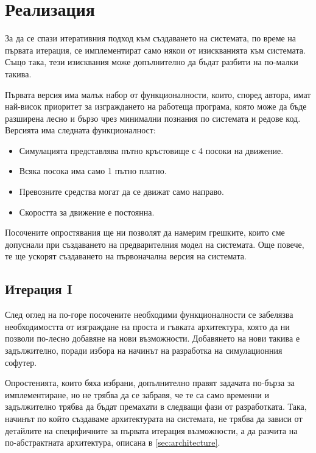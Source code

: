 \section{Реализация}

	За да се спази итеративния подход към създаването на системата,
	по време на първата итерация, се имплементират само някои от изискванията към системата. 
	Също така, тези изисквания може допълнително да бъдат разбити на по-малки такива.
	
	Първата версия има малък набор от функционалности, които, според автора, имат най-висок приоритет за
	изграждането на работеща програма, която може да бъде разширена лесно и бързо
	чрез минимални познания по системата и редове код.
	Версията има следната функционалност:
	\begin{itemize}
		\item Симулацията представлява пътно кръстовище с 4 посоки на движение.
		\item Всяка посока има само 1 пътно платно.
		\item Превозните средства могат да се движат само направо.
		\item Скоростта за движение е постоянна.
	\end{itemize}
	
	Посочените опростявания ще ни позволят да намерим грешките, които сме допуснали
	при създаването на предварителния модел на системата. Още повече, 
	те ще ускорят създаването на първоначална версия на системата.
	
	\subsection{Итерация I}
	
		След оглед на по-горе посочените необходими функционалности се забелязва необходимостта от 
		изграждане на проста и гъвката архитектура, която да ни позволи по-лесно добавяне на нови възможности. 
		Добавянето на нови такива е задължително, поради избора на начинът на разработка на симулационния софутер. 		
		
		Опростенията, които бяха избрани, допълнително правят задачата по-бърза за имплементиране,
		но не трябва да се забравя, че те са само временни и задължително трябва да бъдат премахати
		в следващи фази от разработката. Така, начинът по който създаваме архитектурата
		на системата, не трябва да зависи от детайлите на специфичните за първата итерация
		възможности, а да разчита на по-абстрактната архитектура, описана в \ref{sec:architecture}.
		
